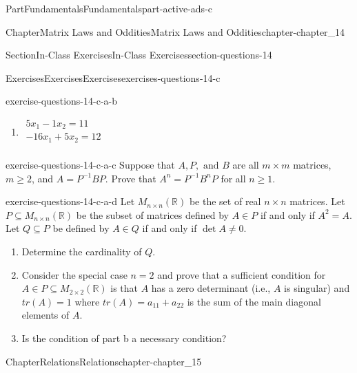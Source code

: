 \documentclass[oneside,10pt,]{book}
\numberwithin{equation}{section}
\begin{document}
\begin{partptx}{Part}{Fundamentals}{}{Fundamentals}{}{}{part-active-ads-c}
\begin{chapterptx}{Chapter}{Matrix Laws and Oddities}{}{Matrix Laws and Oddities}{}{}{chapter-chapter_14}
\begin{sectionptx}{Section}{In-Class Exercises}{}{In-Class Exercises}{}{}{section-questions-14}
\begin{exercises-subsection-numberless}{Exercises}{Exercises}{}{Exercises}{}{}{exercises-questions-14-c}
\begin{exercisegroup}
\begin{divisionexerciseeg}{2}{}{}{exercise-questions-14-c-a-b}
\begin{multicols}{2}
\begin{enumerate}[label=(\alph*)]
\item{}\(\displaystyle \begin{array}{c}5x_1-1x_2= 11\\
-16x_1 +5x_2= 12\\
\end{array}\)%
\end{enumerate}
\end{multicols}
%
\end{divisionexerciseeg}%
\begin{divisionexerciseeg}{3}{}{}{exercise-questions-14-c-a-c}%
Suppose that \(A, P, \textrm{ and } B\) are all \(m \times m\) matrices, \(m \geq 2\), and \(A= P^{-1} B P\). Prove that  \(A^n = P^{-1} B^n P\) for all \(n \geq 1\).%
\end{divisionexerciseeg}%
\begin{divisionexerciseeg}{4}{}{}{exercise-questions-14-c-a-d}%
Let \(M_{n\times n}(\mathbb{R})\) be the set of real \(n\times n\) matrices. Let \(P \subseteq  M_{n\times n}(\mathbb{R})\) be the subset of matrices defined by \(A \in  P\) if and only if \(A^2 = A\). Let \(Q \subseteq  P\) be defined by \(A\in Q\) if and only if \(\det A \neq  0\).%
\par
%
\begin{enumerate}[label=(\alph*)]
\item{}Determine the cardinality of \(Q\).%
\item{}Consider the special case \(n = 2\) and prove that a sufficient condition for \(A \in  P \subseteq  M_{2\times 2}(\mathbb{R})\) is that \(A\) has a zero determinant (i.e., \(A\) is singular) and \(tr(A) = 1\) where \(tr(A) = a_{11}+ a _{22}\) is the sum of the main diagonal elements of \(A\).%
\item{}Is the condition of part b a necessary condition?%
\end{enumerate}
%
\end{divisionexerciseeg}%
\end{exercisegroup}
\par\medskip\noindent
\end{exercises-subsection-numberless}
\end{sectionptx}
\end{chapterptx}
%
\typeout{************************************************}
\typeout{************************************************}
%
\begin{chapterptx}{Chapter}{Relations}{}{Relations}{}{}{chapter-chapter_15}
\renewcommand*{\chaptername}{Chapter}
\index{}%

\end{chapterptx}
\end{partptx}
\end{document}
